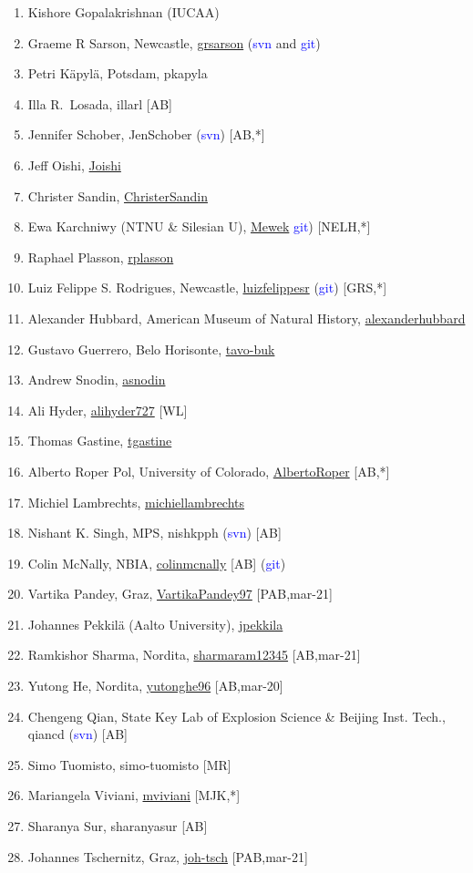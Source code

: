 \documentclass{article}
\def\blue{\textcolor{blue}}
\begin{document}
\begin{enumerate}
\item Kishore Gopalakrishnan (IUCAA)
\item Graeme R Sarson, Newcastle, \url{grsarson} (\blue{svn} and \blue{git})
\item Petri K\"apyl\"a, Potsdam, pkapyla
\item Illa R.\ Losada, illarl [AB]
\item Jennifer Schober, JenSchober (\blue{svn}) [AB,*]
\item Jeff Oishi, \url{Joishi}
\item Christer Sandin, \url{ChristerSandin}
\item Ewa Karchniwy (NTNU \& Silesian U), \url{Mewek} \blue{git}) [NELH,*]
\item Raphael Plasson, \url{rplasson}
\item Luiz Felippe S. Rodrigues, Newcastle, \url{luizfelippesr} (\blue{git}) [GRS,*]
\item Alexander Hubbard, American Museum of Natural History, \url{alexanderhubbard}
\item Gustavo Guerrero, Belo Horisonte, \url{tavo-buk}
\item Andrew Snodin, \url{asnodin}
\item Ali Hyder, \url{alihyder727} [WL]
\item Thomas Gastine, \url{tgastine}
\item Alberto Roper Pol, University of Colorado, \url{AlbertoRoper} [AB,*]
\item Michiel Lambrechts, \url{michiellambrechts}
\item Nishant K. Singh, MPS, nishkpph (\blue{svn}) [AB]
\item Colin McNally, NBIA, \url{colinmcnally} [AB] (\blue{git})
\item Vartika Pandey, Graz, \url{VartikaPandey97} [PAB,mar-21]
\item Johannes Pekkil\"a (Aalto University), \url{jpekkila}
\item Ramkishor Sharma, Nordita, \url{sharmaram12345} [AB,mar-21]
\item Yutong He, Nordita, \url{yutonghe96} [AB,mar-20]
\item Chengeng Qian, State Key Lab of Explosion Science \& Beijing Inst. Tech., qiancd (\blue{svn}) [AB]
\item Simo Tuomisto, simo-tuomisto [MR] %
\item Mariangela Viviani, \url{mviviani} [MJK,*]
\item Sharanya Sur, sharanyasur [AB] %
\item Johannes Tschernitz, Graz, \url{joh-tsch} [PAB,mar-21]

\end{enumerate}
\end{document}
